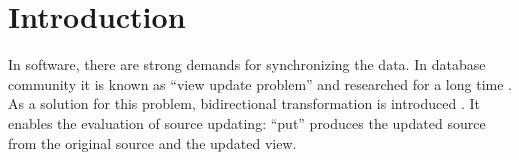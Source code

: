 \section{Introduction}



In software, there are strong demands for synchronizing the data. In database community it is known as ``view update problem'' and researched for a long time \cite{}.
As a solution for this problem, bidirectional transformation is introduced \cite{}. It enables the evaluation of source updating: ``put'' produces the updated source from the original source and the updated view.

